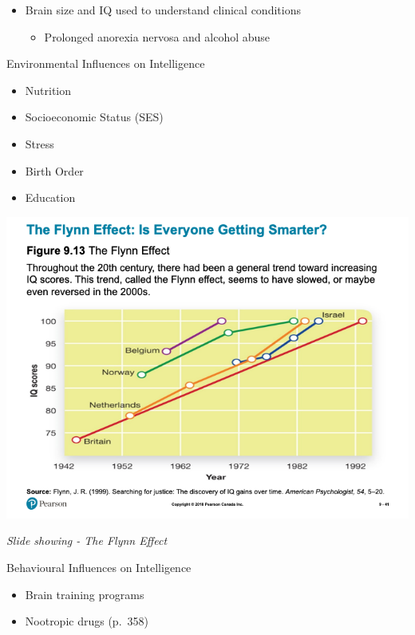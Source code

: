 \documentclass[
]{book}
\providecommand{\tightlist}{%
  \setlength{\itemsep}{0pt}\setlength{\parskip}{0pt}}
\begin{document}
\begin{reflect}
\begin{itemize}
  \begin{itemize}
  \tightlist
  \item
    Brain size and IQ used to understand clinical conditions

    \begin{itemize}
    \tightlist
    \item
      Prolonged anorexia nervosa and alcohol abuse
    \end{itemize}
  \end{itemize}
\end{itemize}

Environmental Influences on Intelligence

\begin{itemize}
\tightlist
\item
  Nutrition\\
\item
  Socioeconomic Status (SES)\\
\item
  Stress\\
\item
  Birth Order\\
\item
  Education
\end{itemize}

\includegraphics{assets/unit_2/slide_41.png}

\emph{Slide showing - The Flynn Effect}

Behavioural Influences on Intelligence

\begin{itemize}
\tightlist
\item
  Brain training programs\\
\item
  Nootropic drugs (p.~358)
\end{itemize}
\end{reflect}
\end{document}
